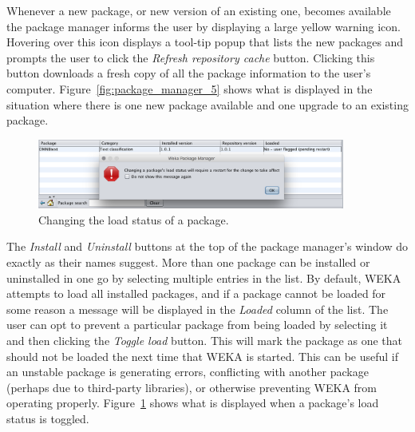 Whenever a new package, or new version of an existing one, becomes
available the package manager informs the user by displaying a large
yellow warning icon. Hovering over this icon displays a tool-tip popup
that lists the new packages and prompts the user to click
the \textit{Refresh repository cache} button. Clicking this button
downloads a fresh copy of all the package information to the user's
computer. Figure~\ref{fig:package_manager_5} shows what is displayed
in the situation where there is one new package available and one
upgrade to an existing package.

\begin{figure}[!th]
\centering
\includegraphics[width=0.9\textwidth]{images/P6.png}
\caption{Changing the load status of a package.}
\label{fig:package_manager_6}
\end{figure}

The \textit{Install} and \textit{Uninstall} buttons at the top of the
package manager's window do exactly as their names suggest. More than
one package can be installed or uninstalled in one go by selecting
multiple entries in the list. By default, WEKA attempts to load all
installed packages, and if a package cannot be loaded for some reason
a message will be displayed in the \textit{Loaded} column of the
list. The user can opt to prevent a particular package from being
loaded by selecting it and then clicking the \textit{Toggle load}
button. This will mark the package as one that should not be loaded
the next time that WEKA is started. This can be useful if an unstable
package is generating errors, conflicting with another package
(perhaps due to third-party libraries), or otherwise preventing WEKA
from operating properly. Figure~\ref{fig:package_manager_6} shows what
is displayed when a package's load status is toggled.
